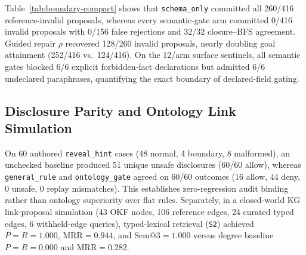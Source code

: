 Table~\ref{tab:boundary-compact} shows that \texttt{schema\_only} committed all 260/416 reference-invalid proposals, whereas every semantic-gate arm committed 0/416 invalid proposals with 0/156 false rejections and 32/32 closure--BFS agreement. Guided repair $\rho$ recovered 128/260 invalid proposals, nearly doubling goal attainment (252/416 vs.\ 124/416). On the 12/arm surface sentinels, all semantic gates blocked 6/6 explicit forbidden-fact declarations but admitted 6/6 undeclared paraphrases, quantifying the exact boundary of declared-field gating.

\subsection{Disclosure Parity and Ontology Link Simulation}
On 60 authored \texttt{reveal\_hint} cases (48 normal, 4 boundary, 8 malformed), an unchecked baseline produced 51 unique unsafe disclosures (60/60 allow), whereas \texttt{general\_rule} and \texttt{ontology\_gate} agreed on 60/60 outcomes (16 allow, 44 deny, 0 unsafe, 0 replay mismatches). This establishes zero-regression audit binding rather than ontology superiority over flat rules. Separately, in a closed-world KG link-proposal simulation (43 OKF nodes, 106 reference edges, 24 curated typed edges, 6 withheld-edge queries), typed-lexical retrieval (\texttt{S2}) achieved $P{=}R{=}1.000$, $\mathrm{MRR}{=}0.944$, and $\mathrm{Sem@3}{=}1.000$ versus degree baseline $P{=}R{=}0.000$ and $\mathrm{MRR}{=}0.282$.

